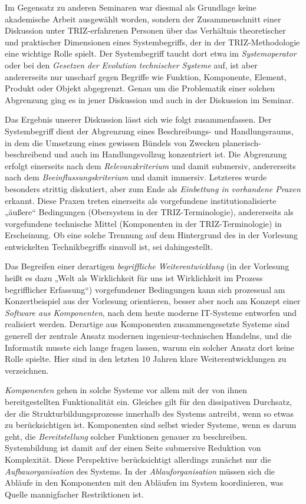 \documentclass[11pt,a4paper]{article}
\begin{document}
Im Gegensatz zu anderen Seminaren war diesmal als Grundlage keine akademische
Arbeit ausgewählt worden, sondern der Zusammenschnitt einer Diskussion unter
TRIZ-erfahrenen Personen über das Verhältnis theoretischer und praktischer
Dimensionen eines Systembegriffs, der in der TRIZ-Methodologie eine wichtige
Rolle spielt. Der Systembegriff taucht dort etwa im \emph{Systemoperator} oder
bei den \emph{Gesetzen der Evolution technischer Systeme} auf, ist aber
andererseits nur unscharf gegen Begriffe wie Funktion, Komponente, Element,
Produkt oder Objekt abgegrenzt. Genau um die Problematik einer solchen
Abgrenzung ging es in jener Diskussion und auch in der Diskussion im Seminar.

Das Ergebnis unserer Diskussion lässt sich wie folgt zusammenfassen. Der
Systembegriff dient der Abgrenzung eines Beschreibungs- und Handlungsraums, in
dem die Umsetzung eines gewissen Bündels von Zwecken planerisch-beschreibend
und auch im Handlungsvollzug konzentriert ist.  Die Abgrenzung erfolgt
einerseits nach dem \emph{Relevanzkriterium} und damit submersiv, andererseits
nach dem \emph{Beeinflussungskriterium} und damit immersiv. Letzteres wurde
besonders strittig diskutiert, aber zum Ende als \emph{Einbettung in
  vorhandene Praxen} erkannt. Diese Praxen treten einerseits als vorgefundene
institutionalisierte „äußere“ Bedingungen (Obersystem in der
TRIZ-Terminologie), andererseits als vorgefundene technische Mittel
(Komponenten in der TRIZ-Terminologie) in Erscheinung. Ob eine solche Trennung
auf dem Hintergrund des in der Vorlesung entwickelten Technikbegriffs sinnvoll
ist, sei dahingestellt.

Das Begreifen einer derartigen \emph{begriff\-liche Weiterentwicklung} (in der
Vorlesung heißt es dazu „Welt als Wirklichkeit für uns ist Wirklichkeit im
Prozess begriff\-licher Erfassung“) vorgefundener Bedingungen kann sich
prozessual am Konzertbeispiel aus der Vorlesung orientieren, besser aber noch
am Konzept einer \emph{Software aus Komponenten}, nach dem heute moderne
IT-Systeme entworfen und realisiert werden. Derartige aus Komponenten
zusammengesetzte Systeme sind generell der zentrale Ansatz modernen
ingenieur-technischen Handelns, und die Informatik musste sich lange fragen
lassen, warum ein solcher Ansatz dort keine Rolle spielte. Hier sind in den
letzten 10 Jahren klare Weiterentwicklungen zu verzeichnen.

\emph{Komponenten} gehen in solche Systeme vor allem mit der von ihnen
bereitgestellten Funktionalität ein. Gleiches gilt für den dissipativen
Durchsatz, der die Strukturbildungsprozesse innerhalb des Systems antreibt,
wenn so etwas zu berücksichtigen ist. Komponenten sind selbst wieder Systeme,
wenn es darum geht, die \emph{Bereitstellung} solcher Funktionen genauer zu
beschreiben. Systembildung ist damit auf der einen Seite submersive Reduktion
von Komplexität. Diese Perspektive berücksichtigt allerdings zunächst nur die
\emph{Aufbauorganisation} des Systems. In der \emph{Ablauforganisation} müssen
sich die Abläufe in den Komponenten mit den Abläufen im System koordinieren,
was Quelle mannigfacher Restriktionen ist.
\end{document}
